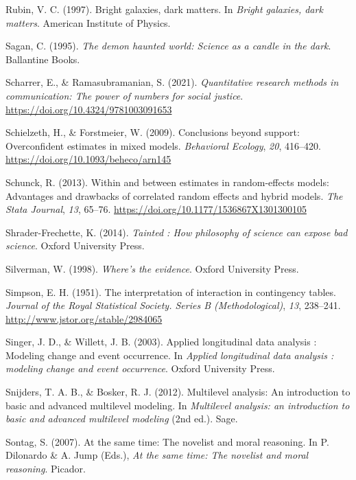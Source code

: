 \documentclass[
  letterpaper,
  DIV=11,
  numbers=noendperiod]{scrreprt}
\newlength{\cslhangindent}
\newenvironment{CSLReferences}[2] %
 {\begin{list}{}{%
  \setlength{\itemindent}{0pt}
  \setlength{\leftmargin}{0pt}
  \setlength{\parsep}{0pt}
  \ifodd #1
   \setlength{\leftmargin}{\cslhangindent}
   \setlength{\itemindent}{-1\cslhangindent}
  \fi
  \setlength{\itemsep}{#2\baselineskip}}}
 {\end{list}}
\begin{document}
\begin{CSLReferences}{1}{0}
Rubin, V. C. (1997). Bright galaxies, dark matters. In \emph{Bright
galaxies, dark matters}. American Institute of Physics.

Sagan, C. (1995). \emph{The demon haunted world: Science as a candle in
the dark}. Ballantine Books.

Scharrer, E., \& Ramasubramanian, S. (2021). \emph{Quantitative research
methods in communication: The power of numbers for social justice}.
\url{https://doi.org/10.4324/9781003091653}

Schielzeth, H., \& Forstmeier, W. (2009). Conclusions beyond support:
Overconfident estimates in mixed models. \emph{Behavioral Ecology},
\emph{20}, 416--420. \url{https://doi.org/10.1093/beheco/arn145}

Schunck, R. (2013). Within and between estimates in random-effects
models: Advantages and drawbacks of correlated random effects and hybrid
models. \emph{The Stata Journal}, \emph{13}, 65--76.
\url{https://doi.org/10.1177/1536867X1301300105}

Shrader-Frechette, K. (2014). \emph{Tainted : How philosophy of science
can expose bad science}. Oxford University Press.

Silverman, W. (1998). \emph{Where's the evidence}. Oxford University
Press.

Simpson, E. H. (1951). The interpretation of interaction in contingency
tables. \emph{Journal of the Royal Statistical Society. Series B
(Methodological)}, \emph{13}, 238--241.
\url{http://www.jstor.org/stable/2984065}

Singer, J. D., \& Willett, J. B. (2003). Applied longitudinal data
analysis : Modeling change and event occurrence. In \emph{Applied
longitudinal data analysis : modeling change and event occurrence}.
Oxford University Press.

Snijders, T. A. B., \& Bosker, R. J. (2012). Multilevel analysis: An
introduction to basic and advanced multilevel modeling. In
\emph{Multilevel analysis: an introduction to basic and advanced
multilevel modeling} (2nd ed.). Sage.

Sontag, S. (2007). At the same time: The novelist and moral reasoning.
In P. Dilonardo \& A. Jump (Eds.), \emph{At the same time: The novelist
and moral reasoning}. Picador.


\end{CSLReferences}
\end{document}
